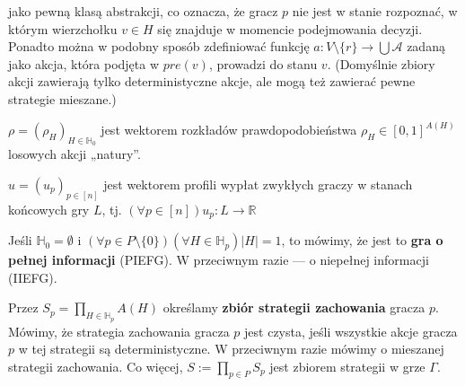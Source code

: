 \begin{definicja}
\begin{enumerate*}[label=\roman*)]
        jako pewną klasą abstrakcji, co oznacza, że gracz $p$ nie jest w stanie rozpoznać, w którym wierzchołku $v \in H$ się
        znajduje w momencie podejmowania decyzji.
        Ponadto można w podobny sposób zdefiniować funkcję $a : V \setminus \{r\} \rightarrow \bigcup \mathcal{A}$ zadaną jako akcja, która podjęta w $pre(v)$,
        prowadzi do stanu $v$. (Domyślnie zbiory akcji zawierają tylko deterministyczne akcje, ale mogą też zawierać pewne strategie mieszane.)
        \item $\rho = (\rho_H)_{H \in \mathbb{H}_0}$ jest wektorem rozkładów prawdopodobieństwa $\rho_H \in [0, 1]^{A(H)}$ losowych akcji „natury”.
        \item $u = (u_p)_{p \in [n]}$ jest wektorem profili wypłat zwykłych graczy w stanach końcowych gry $L$, tj. $(\forall p \in [n]) u_p : L \rightarrow \mathbb{R}$
    \end{enumerate*}
\end{definicja}

\begin{definicja}
    Jeśli $\mathbb{H}_0 = \emptyset$ i $(\forall p \in P \setminus \{0\})(\forall H \in \mathbb{H}_p) |H| = 1$,
    to mówimy, że jest to \textbf{gra o pełnej informacji} (PIEFG). W przeciwnym razie --- o niepełnej informacji (IIEFG).
\end{definicja}

\begin{definicja}
    Przez $S_p = \prod\limits_{H \in \mathbb{H}_p}A(H)$ określamy \textbf{zbiór strategii zachowania} gracza $p$.
    Mówimy, że strategia zachowania gracza $p$ jest czysta, jeśli wszystkie akcje gracza $p$ w tej strategii są deterministyczne.
    W przeciwnym razie mówimy o mieszanej strategii zachowania. Co więcej, $S := \prod\limits_{p \in P}S_p$ jest zbiorem strategii w grze $\Gamma$.
\end{definicja}
